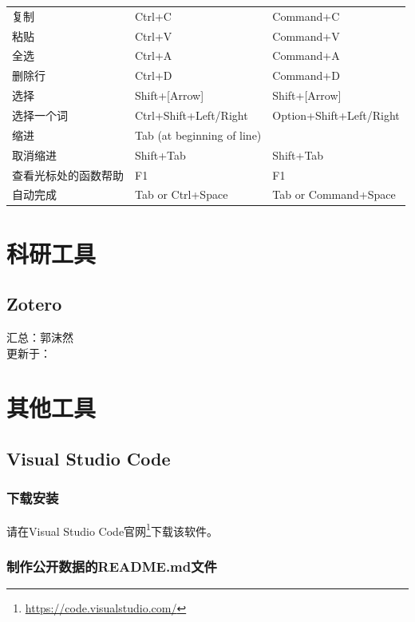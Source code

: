 \documentclass[]{ctexbook}
\renewcommand{\href}[2]{#2\footnote{\url{#1}}}
\theoremstyle{definition}
\theoremstyle{definition}
\theoremstyle{definition}
\theoremstyle{definition}
\theoremstyle{remark}
\begin{document}
\begin{longtable}[]{@{}lll@{}}
复制 & Ctrl+C & Command+C \\
粘贴 & Ctrl+V & Command+V \\
全选 & Ctrl+A & Command+A \\
删除行 & Ctrl+D & Command+D \\
选择 & Shift+{[}Arrow{]} & Shift+{[}Arrow{]} \\
选择一个词 & Ctrl+Shift+Left/Right & Option+Shift+Left/Right \\
缩进 & Tab (at beginning of line) & \\
取消缩进 & Shift+Tab & Shift+Tab \\
查看光标处的函数帮助 & F1 & F1 \\
自动完成 & Tab or Ctrl+Space & Tab or Command+Space \\
\end{longtable}

\part{科研工具}\label{part-ux79d1ux7814ux5de5ux5177}

\chapter{Zotero}\label{zotero}

汇总：郭沫然\\
更新于：

\part{其他工具}\label{part-ux5176ux4ed6ux5de5ux5177}

\chapter{Visual Studio Code}\label{vscode}

\section{下载安装}\label{ux4e0bux8f7dux5b89ux88c5}

请在\href{https://code.visualstudio.com/}{Visual Studio Code官网}下载该软件。

\section{制作公开数据的README.md文件}\label{mkreadme}
\end{document}
